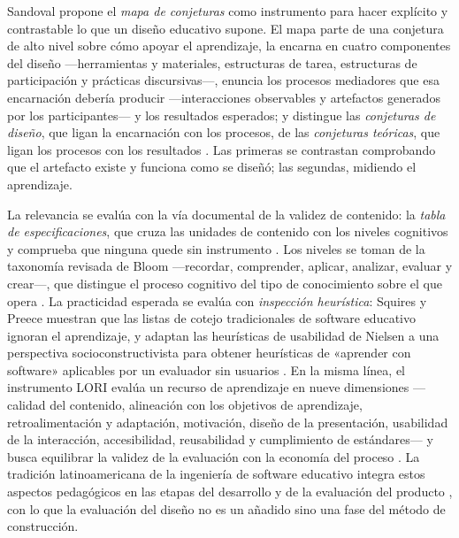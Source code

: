 Sandoval propone el \emph{mapa de conjeturas} como instrumento para hacer explícito y contrastable lo que un diseño educativo supone. El mapa parte de una conjetura de alto nivel sobre cómo apoyar el aprendizaje, la encarna en cuatro componentes del diseño —herramientas y materiales, estructuras de tarea, estructuras de participación y prácticas discursivas—, enuncia los procesos mediadores que esa encarnación debería producir —interacciones observables y artefactos generados por los participantes— y los resultados esperados; y distingue las \emph{conjeturas de diseño}, que ligan la encarnación con los procesos, de las \emph{conjeturas teóricas}, que ligan los procesos con los resultados \autocite{sandoval2014conjecture}. %
Las primeras se contrastan comprobando que el artefacto existe y funciona como se diseñó; las segundas, midiendo el aprendizaje.

La relevancia se evalúa con la vía documental de la validez de contenido: la \emph{tabla de especificaciones}, que cruza las unidades de contenido con los niveles cognitivos y comprueba que ninguna quede sin instrumento \autocite{sampieri2018metodologia}. %
Los niveles se toman de la taxonomía revisada de Bloom —recordar, comprender, aplicar, analizar, evaluar y crear—, que distingue el proceso cognitivo del tipo de conocimiento sobre el que opera \autocite{anderson2001taxonomy}. %
La practicidad esperada se evalúa con \emph{inspección heurística}: Squires y Preece muestran que las listas de cotejo tradicionales de software educativo ignoran el aprendizaje, y adaptan las heurísticas de usabilidad de Nielsen a una perspectiva socioconstructivista para obtener heurísticas de «aprender con software» aplicables por un evaluador sin usuarios \autocite{squires1999predicting}. %
En la misma línea, el instrumento LORI evalúa un recurso de aprendizaje en nueve dimensiones —calidad del contenido, alineación con los objetivos de aprendizaje, retroalimentación y adaptación, motivación, diseño de la presentación, usabilidad de la interacción, accesibilidad, reusabilidad y cumplimiento de estándares— y busca equilibrar la validez de la evaluación con la economía del proceso \autocite{leacock2007framework}. %
La tradición latinoamericana de la ingeniería de software educativo integra estos aspectos pedagógicos en las etapas del desarrollo y de la evaluación del producto \autocite{galvis1992ingenieria,cataldi2000metodologia}, con lo que la evaluación del diseño no es un añadido sino una fase del método de construcción.

